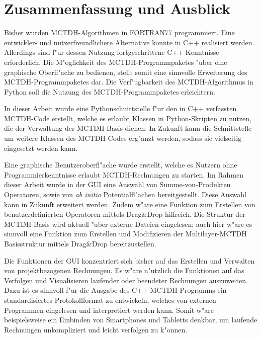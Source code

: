 \chapter{Zusammenfassung und Ausblick}
\label{cha:fazit}

Bisher wurden MCTDH-Algorithmen in FORTRAN77 programmiert. Eine entwickler- und nutzerfreundlichere Alternative
konnte in C++ realisiert werden. 
Allerdings sind f"ur dessen Nutzung fortgeschrittene C++ Kenntnisse erforderlich. 
Die M"oglichkeit des MCTDH-Programmpaketes "uber eine graphische Oberfl"ache zu bedienen,
stellt somit eine sinnvolle Erweiterung des MCTDH-Programmpaketes dar. 
Die Verf"ugbarkeit des MCTDH-Algorithmus in Python soll die Nutzung des MCTDH-Programmpaketes
erlei\-chtern.

In dieser Arbeit wurde eine Pythonschnittstelle f"ur den in C++ verfassten MCTDH-Code erstellt, 
welche es erlaubt Klassen in Python-Skripten zu nutzen, die der Verwaltung der MCTDH-Basis dienen. 
In Zukunft kann die Schnittstelle um weitere Klassen des MCTDH-Codes erg"anzt werden, sodass sie
vielseitig eingesetzt werden kann.

Eine graphische Benutzeroberfl"ache wurde erstellt, welche es Nutzern ohne Programmierkenntnisse
erlaubt MCTDH-Rechnungen zu starten. Im Rahmen dieser Arbeit wurde in der GUI eine Auswahl von
Summe-von-Produkten Operatoren, sowie von \textit{ab initio} Potentialfl"achen bereitgestellt.
Diese Auswahl kann in Zukunft erweitert werden. Zudem w"are eine Funktion zum Erstellen von
benutzerdefinierten Operatoren mittels Drag\&Drop hilfreich. Die Struktur der MCTDH-Basis
wird aktuell "uber externe Dateien eingelesen; auch hier w"are es sinnvoll eine Funktion zum
Erstellen und Modifizieren der Multilayer-MCTDH Basisstruktur mittels Drag\&Drop bereitzustellen.

Die Funktionen der GUI konzentriert sich bisher auf das Erstellen und Verwalten von
projektbezogenen Rechnungen. Es w"are n"utzlich die Funktionen auf das Verfolgen und Visualisieren
laufender oder beendeter Rechnungen auszuweiten. Dazu ist es sinnvoll f"ur die Ausgabe des C++ 
MCTDH-Programms ein standardisiertes Protokollformat zu entwickeln, welches von externen Programmen eingelesen
und interpretiert werden kann. Somit w"are beispielsweise ein Einbinden von Smartphones und Tabletts
denkbar, um laufende Rechnungen unkompliziert und leicht verfolgen zu k"onnen.

